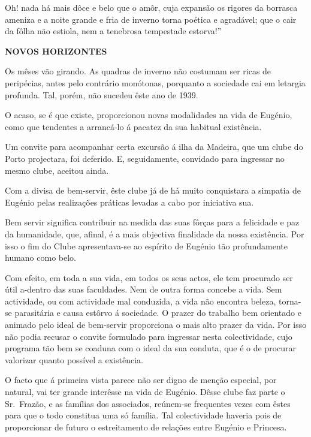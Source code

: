 \documentclass[9pt]{article}
\begin{document}
Oh! nada há mais dôce e belo que o amôr, cuja expansão os rigores
da borrasca ameniza e a noite gran\-de e fria de inverno torna poética
e a\-gra\-dá\-vel; que o cair da fô\-lha não estiola, nem a tenebrosa tempestade estorva!''

\begin{center}\bf\large NOVOS HORIZONTES\end{center}

Os mêses vão girando. As quadras de inverno não costumam ser ricas
de peripécias, antes pelo contrário monótonas, porquanto a sociedade cai
em letargia profunda. Tal, porém, não sucedeu êste ano de 1939.

O acaso, se é que existe, proporcionou novas modalidades na vida de
Eugé\-nio, como que tendentes a arrancá-lo á pacatez da sua habitual exis\-tên\-cia.

Um convite para acompanhar certa excursão á i\-lha da Madeira, que um
clube do Porto projectara, foi deferido. E, seguidamente, convidado para ingressar no mesmo clube, aceitou ainda.

Com a divisa de bem-servir, êste clube já de há muito conquistara
a simpatia de Eugé\-nio pelas realiza\-ções práticas levadas a cabo por ini\-cia\-tiva sua.

Bem servir signifi\-ca contribuir na medida das suas fôrças para a felicidade e paz da humanidade, que, afinal, é a mais objectiva finalidade
da nossa exis\-tên\-cia. Por isso o fim do Clube apresentava-se ao espírito
de Eugé\-nio tão profundamente humano como belo.

Com efeito, em toda a sua vida, em todos os seus actos, ele tem procurado ser útil a-dentro das suas faculdades. Nem de outra forma concebe
a vida. Sem actividade, ou com actividade mal conduzida, a vida não encontra
beleza, torna-se parasitária e causa estôrvo á sociedade. O prazer do
traba\-lho bem orientado e animado pelo ideal de bem-servir proporciona o
mais alto prazer da vida. Por isso não podia recusar o convite formulado
para ingressar nesta colectividade, cujo programa tão bem se coaduna com o
ideal da sua conduta, que é o de procurar valorizar quanto possível a
exis\-tên\-cia.

O facto que á primeira vista parece não ser digno de men\-ção especial,
por natural, vai ter gran\-de interêsse na vida de Eugé\-nio. Dêsse clube faz
parte o Sr.\ Frazão, e as fa\-mí\-lias dos associados, reúnem-se frequentes vezes com êstes para que o todo constitua uma só fa\-mí\-lia. Tal colectividade
haveria pois de proporcionar de futuro o estreitamento de rela\-ções entre
Eugé\-nio e Princesa.
\end{document}
